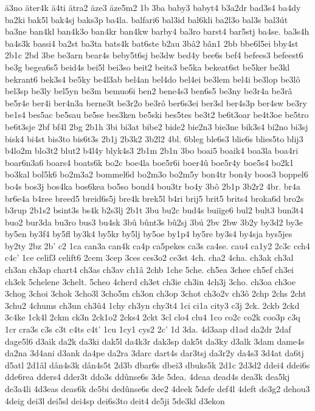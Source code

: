 {ä3no
äter4k
ä4ti
ätra2
äze3
äze5m2
1b
3ba
baby3
babyt4
b3a2dr
bad3s4
ba4dy
ba2ki
bak5l
bak4sj
baks3p
ba4la.
balfari6
bal3id
bal6kli
ba2l3o
bal3s
bal3út
ba3ne
ban4kl
ban4k3o
ban4kr
ban4kw
barby4
ba3ro
barst4
bar5stj
ba4se.
ba3s4h
ba4s3k
bassi4
ba2st
ba3ta
bats4k
bat6ste
b2au
3bâ2
bân1
2bb
bbe6l5ei
bby4st
2b1c
2bd
3be
be3arn
bear4s
beby5t6sj
be3dw
bed4y
bee6s
bef4
befees3
befeest6
be3g
begea6s5
beid4s
bei5l
bei3so
beit2
beits3
be5ka
bekeat6st
be5ker
be3kl
bekrant6
bek3s4
be5ky
be4l3ab
bel4an
bel4do
bel4ei
be3lem
bel4i
be3lop
be3lô
bel3sp
be3ly
bel5yn
be3m
bemuo6i
ben2
bene4s3
ben6s5
be3ny
be3r4a
be3râ
be5r4e
ber4i
ber4n3a
berne3t
be3r2o
be3rô
ber6s3ei
ber3sl
ber4s3p
ber4sw
be3ry
be1s4
bes5ac
be5sau
be5se
bes3ken
be5ski
bes5tes
be3t2
be6t3oar
be4t3oe
be5tro
be6t3sje
2bf
bf4l
2bg
2b1h
3bi
bi3at
bibe2
bide2
bie2n3
bie3ne
bik3s4
bi2no
bi3sj
bisk4
bi4st
bis3to
bis6t3s
2b1j
2b3k2
3b2l2
4bl.
6bleg
ble6s3
blie6s
blies5to
blij3
b4lo2m
blo3t2
blut2
b4l4y
blyk4s3
2b1m
2b1n
3bo
boai5
boaik4
boa3la
boa4ri
boar6n3a6
boars4
boats6k
bo2c
boe4la
boe5r6i
boer4û
boe5r4y
boe5s4
bo2k1
bo3kal
bol5k6
bo2m3a2
bommel6d
bo2m3o
bo2m5y
bon4tr
bon4y
boos3
boppel6
bo4s
bos3j
bos4ka
bos6kea
bo5so
boud4
bou3tr
bo4y
3bô
2b1p
3b2r2
4br.
br4a
br6e4a
b4ree
breed5
breid6s5j
bre4k
brek5l
b4ri
brij5
brit5
brits4
broka6d
bro2s
b3rup
2b1s2
bsint3s
bs4k
b2s3lj
2b1t
3bu
bu2c
bud4s
buiïge6
bul2
bult3
bun3t4
buo2
bur3da
bu3ro
bus3
bu4sk
3bû
bûnt3s
bû2sj
3bú
2bv
2bw
3b2y
by3d2
by3e
by5en
by3f4
by5fl
by3k4
by5kr
by5lj
by5oe
by1p4
by5re
by3s4
by4sja
bys5jes
by2ty
2bz
2b'
c2
1ca
can3a
can4k
ca4p
ca5pekes
ca3s
ca4se.
cau4
ca1y2
2c3c
cch4
c4c'
1ce
celif3
celift6
2cem
3cep
3ces
ces3o2
ce3st
4ch.
cha2
4cha.
ch3ak
ch3al
ch3an
ch3ap
chart4
ch3as
ch3av
ch1â
2chb
1che
5che.
ch5ea
3chee
ch5ef
ch3ei
ch3ek
5chelene
3chelt.
5cheo
4cherd
ch3et
ch3ie
ch3in
4ch3j
3cho.
ch3oa
ch3oe
3chog
3choi
3chok
3cho3l
3cho5m
ch3on
ch3op
3chot
ch3o2v
ch3ô
2chp
2chs
2cht
3chu2
4chums
ch3un
ch3û4
1chy
ch3yn
chy3t4
1ci
ci1a
city3
c3j
2ck.
2ckb
2ckd
3c4ke
1ck4l
2ckm
ck3n
2ck1o2
2cks4
2ckt
3cl
clo4
clu4
1co
co2c
co2k
coo3p
c3q
1cr
cra3s
c3s
c3t
c4ts
c4t'
1cu
1cy1
cys2
2c'
1d
3da.
4d3aap
d1ad
da2dr
2daf
dage5l6
d3aik
da2k
da3ki
dak5l
da4k3r
dak3sp
dak5t
da3ky
d3alk
3dam
dame4s
da2na
3d4ani
d3ank
da4pe
da2ra
3darc
dart4s
dar3tsj
da3r2y
da4s3
3d4at
da6tj
d5atl
2d1âl
dân4s3k
dân4s5t
2d3b
dbar6s
dbei3
dbuks5k
2d1c
2d3d2
ddei4
ddei6s
dde6rea
dders4
dder3t
ddo3s
ddûnse6s
3de
5dea.
4deaa
dead4s
dea3k
dea5kj
de3a4li
4d3eas
deas6k
de5bi
dedûnse6s
dee2
4deek
5defe
def4l
4deft
de3g2
dehou3
4deig
dei3l
dei5sl
dei4sp
dei6s3to
deit4
de5ji
5de3kl
d3ekon
}
